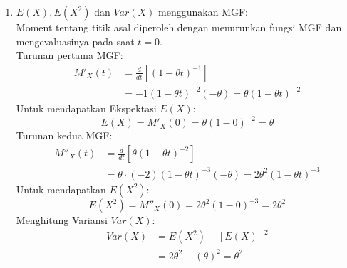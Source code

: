 \documentclass[12pt,a4paper]{article}
\begin{document}
\begin{enumerate}
\begin{enumerate}
          \item $E(X), E(X^2)$ dan $Var(X)$ menggunakan MGF: \\
                Moment tentang titik asal diperoleh dengan menurunkan fungsi MGF dan mengevaluasinya pada saat $t = 0$. \\
                Turunan pertama MGF:
                \begin{align*}
                  M'_X(t) & = \frac{d}{dt} \left[ (1 - \theta t)^{-1} \right]             \\
                          & = -1(1 - \theta t)^{-2} (-\theta) = \theta(1 - \theta t)^{-2}
                \end{align*}
                Untuk mendapatkan Ekspektasi $E(X)$:
                \[
                  E(X) = M'_X(0) = \theta(1 - 0)^{-2} = \theta
                \]
                Turunan kedua MGF:
                \begin{align*}
                  M''_X(t) & = \frac{d}{dt} \left[ \theta(1 - \theta t)^{-2} \right]                         \\
                           & = \theta \cdot (-2)(1 - \theta t)^{-3} (-\theta) = 2\theta^2(1 - \theta t)^{-3}
                \end{align*}
                Untuk mendapatkan $E(X^2)$:
                \[
                  E(X^2) = M''_X(0) = 2\theta^2(1 - 0)^{-3} = 2\theta^2
                \]
                Menghitung Variansi $Var(X)$:
                \begin{align*}
                  Var(X) & = E(X^2) - [E(X)]^2                 \\
                         & = 2\theta^2 - (\theta)^2 = \theta^2
                \end{align*}
        \end{enumerate}
\end{enumerate}
\end{document}
